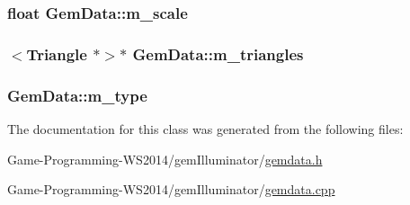 \subsubsection[{m\+\_\+scale}]{\setlength{\rightskip}{0pt plus 5cm}float Gem\+Data\+::m\+\_\+scale\hspace{0.3cm}{\ttfamily [protected]}}\label{class_gem_data_a15953642fe15a2a37aceea037e4ad81e}
\hypertarget{class_gem_data_a21068b04db70d2e37e9c30d816484f25}{}
\subsubsection[{m\+\_\+triangles}]{$<${\bf Triangle} $\ast$$>$$\ast$ Gem\+Data\+::m\+\_\+triangles\hspace{0.3cm}{\ttfamily [protected]}}\label{class_gem_data_a21068b04db70d2e37e9c30d816484f25}
\hypertarget{class_gem_data_a310940114f54b2146f6601662e8a323f}{}
\subsubsection[{m\+\_\+type}]{ Gem\+Data\+::m\+\_\+type\hspace{0.3cm}{\ttfamily [protected]}}\label{class_gem_data_a310940114f54b2146f6601662e8a323f}


The documentation for this class was generated from the following files\+:\begin{DoxyCompactItemize}
\item 
Game-\/\+Programming-\/\+W\+S2014/gem\+Illuminator/\hyperlink{gemdata_8h}{gemdata.\+h}\item 
Game-\/\+Programming-\/\+W\+S2014/gem\+Illuminator/\hyperlink{gemdata_8cpp}{gemdata.\+cpp}\end{DoxyCompactItemize}
